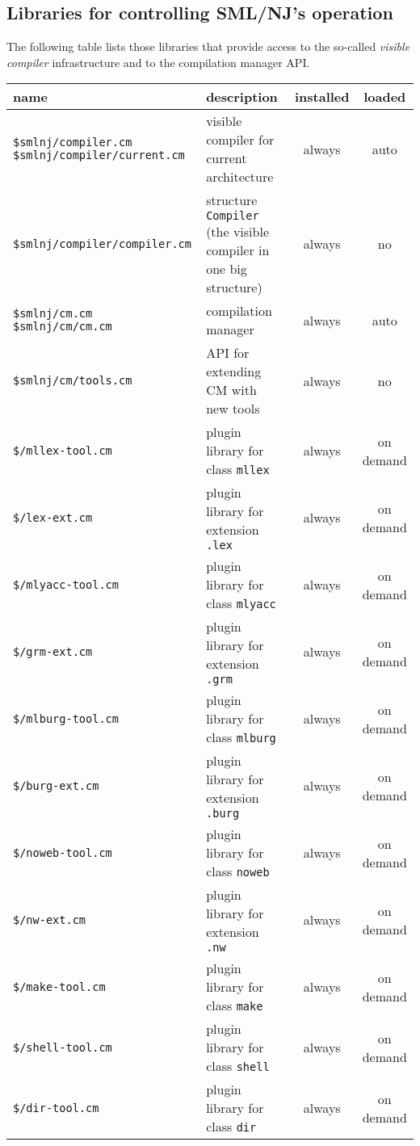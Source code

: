 \subsection{Libraries for controlling SML/NJ's operation}

The following table lists those libraries that provide access to the
so-called {\em visible compiler} infrastructure and to the compilation
manager API.

\begin{small}
\begin{center}
\begin{tabular}{p{2.3in}||p{2.5in}|c|c}
name & description & installed & loaded \\
\hline\hline
{\tt \$smlnj/compiler.cm} \newline
{\tt \$smlnj/compiler/current.cm} & visible compiler for current
architecture & always & auto \\
{\tt \$smlnj/compiler/compiler.cm} & structure {\tt Compiler} (the
visible compiler in one big structure) & always & no \\
\hline\hline
{\tt \$smlnj/cm.cm} \newline
{\tt \$smlnj/cm/cm.cm} & compilation manager & always & auto \\
\hline
{\tt \$smlnj/cm/tools.cm} & API for extending CM with new tools &
always & no \\
\hline\hline
{\tt \$/mllex-tool.cm} & plugin library for class {\tt mllex} & always
& on demand \\
\hline
{\tt \$/lex-ext.cm} & plugin library for extension {\tt .lex} & always
& on demand \\
\hline
{\tt \$/mlyacc-tool.cm} & plugin library for class {\tt mlyacc} &
always & on demand \\
\hline
{\tt \$/grm-ext.cm} & plugin library for extension {\tt .grm} & always
& on demand \\
\hline
{\tt \$/mlburg-tool.cm} & plugin library for class {\tt mlburg} &
always & on demand \\
\hline
{\tt \$/burg-ext.cm} & plugin library for extension {\tt .burg} &
always & on demand \\
\hline
{\tt \$/noweb-tool.cm} & plugin library for class {\tt noweb} & always
& on demand \\
\hline
{\tt \$/nw-ext.cm} & plugin library for extension {\tt .nw} & always &
on demand \\
\hline
{\tt \$/make-tool.cm} & plugin library for class {\tt make} & always &
on demand \\
\hline
{\tt \$/shell-tool.cm} & plugin library for class {\tt shell} & always
& on demand \\
\hline
{\tt \$/dir-tool.cm} & plugin library for class {\tt dir} & always
& on demand
\end{tabular}
\end{center}
\end{small}

